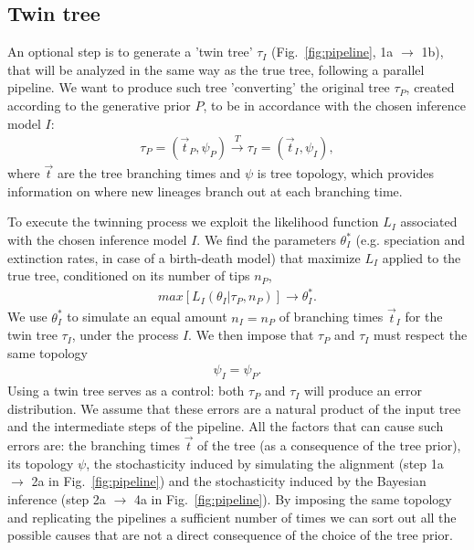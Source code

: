 \documentclass{article}
\begin{document}
\subsection{Twin tree}\label{subsec:twinning}

An optional step is to generate a 'twin tree' $\tau_{I}$
(Fig.~\ref{fig:pipeline}, 1a $\rightarrow$ 1b),
that will be analyzed in the same way as the true tree, following a parallel 
pipeline. We want to produce such tree 'converting' the original tree 
$\tau_{\mathit{P}}$, created according to the generative prior $\mathit{P}$, to 
be in accordance with the chosen inference model $\mathit{I}$:
\begin{align}
    \tau_{\mathit{P}} = (\Vec{t}_{\mathit{P}}, \psi_{\mathit{P}}) 
\xrightarrow[]{\mathit{T}} \tau_{\mathit{I}} = (\Vec{t}_{\mathit{I}}, 
\psi_{\mathit{I}}),
\end{align}
where $\Vec{t}$ are the tree branching times and $\psi$ is tree topology, which 
provides information on where new lineages branch out at each branching time.

To execute the twinning process we exploit the likelihood function 
$L_{\mathit{I}}$ associated with the chosen inference model $\mathit{I}$. We 
find the parameters $\theta^{*}_{\mathit{I}}$ (e.g. speciation and extinction 
rates, in case of a birth-death model) that maximize $L_{\mathit{I}}$ applied 
to the true tree, conditioned on its number of tips $n_{\mathit{P}}$,
\begin{align}
    max[L_{\mathit{I}}(\theta_{\mathit{I}}|\tau_{\mathit{P}}, n_{\mathit{P}})] 
\rightarrow \theta^{*}_{\mathit{I}}.
\end{align}
We use $\theta^{*}_{\mathit{I}}$ to simulate an equal amount $n_{\mathit{I}} = 
n_{\mathit{P}}$ of branching times $\Vec{t}_{\mathit{I}}$ for the twin tree 
$\tau_{\mathit{I}}$, under the process $\mathit{I}$. We then impose that 
$\tau_{\mathit{P}}$ and $\tau_{\mathit{I}}$ must respect the same topology
\begin{align}
    \psi_{\mathit{I}} = \psi_{\mathit{P}}.
\end{align}
Using a twin tree serves as a control: both $\tau_{\mathit{P}}$ and 
$\tau_{\mathit{I}}$ will produce an error distribution. We assume that these 
errors are a natural product of the input tree and the intermediate steps of 
the pipeline. All the factors that can cause such errors are: the branching 
times $\vec{t}$ of the tree (as a consequence of the tree prior), its topology 
$\psi$, the stochasticity induced by simulating the alignment (step 1a 
$\rightarrow$ 2a in Fig.~\ref{fig:pipeline}) and the stochasticity induced by 
the Bayesian inference (step 2a $\rightarrow$ 4a in Fig.~\ref{fig:pipeline}). 
By imposing the same topology and replicating the pipelines a sufficient number 
of times we can sort out all the possible causes that are not a direct 
consequence of the choice of the tree prior.
\end{document}
